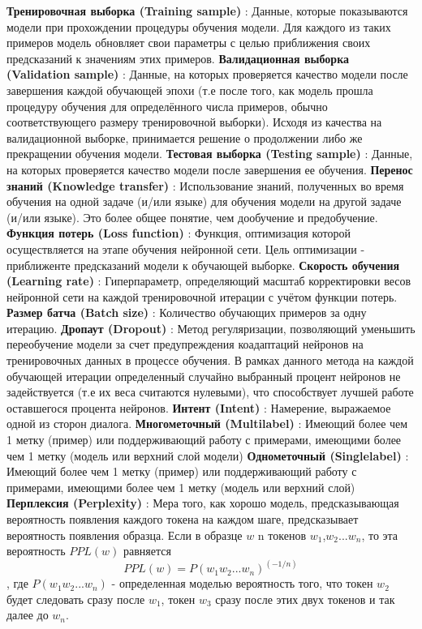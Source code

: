 \textbf{Тренировочная выборка (Training sample)} : Данные, которые показываются модели при прохождении процедуры обучения модели. Для каждого из таких примеров модель обновляет свои параметры с целью приближения своих предсказаний к значениям этих примеров.
\textbf{Валидационная выборка (Validation sample)} : Данные, на которых проверяется качество модели после завершения каждой обучающей эпохи (т.е после того, как модель прошла процедуру обучения для определённого числа примеров, обычно соответствующего размеру тренировочной выборки). Исходя из качества на валидационной выборке, принимается решение о продолжении либо же прекращении обучения модели.
\textbf{Тестовая выборка (Testing sample)} : Данные, на которых проверяется качество модели после завершения ее обучения.
\textbf{Перенос знаний (Knowledge transfer)} : Использование знаний, полученных во время обучения на одной задаче (и/или языке) для обучения модели на другой задаче (и/или языке). Это более общее понятие, чем дообучение и предобучение.
\textbf{Функция потерь (Loss function)} : Функция, оптимизация которой осуществляется на этапе обучения нейронной сети. Цель оптимизации - приближенте предсказаний модели к обучающей выборке.
\textbf{Скорость обучения (Learning rate)} : Гиперпараметр, определяющий масштаб корректировки весов нейронной сети на каждой тренировочной итерации с учётом функции потерь.
\textbf{Размер батча (Batch size)} : Количество обучающих примеров за одну итерацию.
\textbf{Дропаут (Dropout)} : Метод регуляризации, позволяющий уменьшить переобучение модели за счет предупреждения коадаптаций нейронов на тренировочных данных в процессе обучения. В рамках данного метода на каждой обучающей итерации определенный случайно выбранный процент нейронов не задействуется (т.е их веса считаются нулевыми), что способствует лучшей работе оставшегося процента нейронов. 
\textbf{Интент (Intent)} : Намерение, выражаемое одной из сторон диалога.
\textbf{Многометочный (Multilabel)} : Имеющий более чем 1 метку (пример) или поддерживающий работу с примерами, имеющими более чем 1 метку (модель или верхний слой модели)
\textbf{Однометочный (Singlelabel)} : Имеющий более чем 1 метку (пример) или поддерживающий работу с примерами, имеющими более чем 1 метку (модель или верхний слой)
\textbf{Перплексия (Perplexity)} : Мера того, как хорошо модель, предсказывающая вероятность появления каждого токена на каждом шаге, предсказывает вероятность появления образца. Если в образце $w$ n токенов $w_1$,$w_2$...$w_n$, то эта вероятность $PPL(w)$ равняется
\begin{equation} 
PPL(w) = P(w_1w_2... w_n)^(-1/n)
\end{equation},
где $P(w_1w_2... w_n)$ - определенная моделью вероятность того, что токен $w_2$ будет следовать сразу после $w_1$, токен $w_3$ сразу после этих двух токенов и так далее до $w_n$. 

